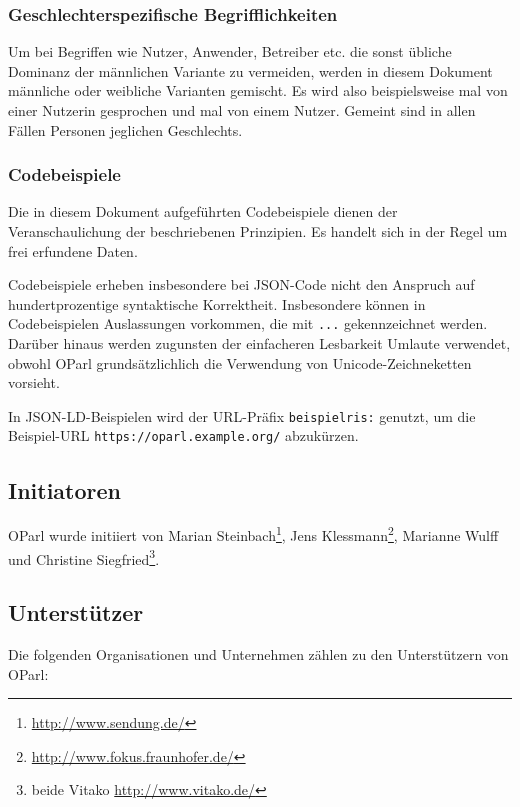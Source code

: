 \documentclass[,a4paper]{article}
\begin{document}
\subsubsection{Geschlechterspezifische
Begrifflichkeiten}\label{geschlechterspezifische-begrifflichkeiten}

Um bei Begriffen wie Nutzer, Anwender, Betreiber etc. die sonst übliche
Dominanz der männlichen Variante zu vermeiden, werden in diesem Dokument
männliche oder weibliche Varianten gemischt. Es wird also beispielsweise
mal von einer Nutzerin gesprochen und mal von einem Nutzer. Gemeint sind
in allen Fällen Personen jeglichen Geschlechts.

\subsubsection{Codebeispiele}\label{codebeispiele}

Die in diesem Dokument aufgeführten Codebeispiele dienen der
Veranschaulichung der beschriebenen Prinzipien. Es handelt sich in der
Regel um frei erfundene Daten.

Codebeispiele erheben insbesondere bei JSON-Code nicht den Anspruch auf
hundertprozentige syntaktische Korrektheit. Insbesondere können in
Codebeispielen Auslassungen vorkommen, die mit \texttt{...}
gekennzeichnet werden. Darüber hinaus werden zugunsten der einfacheren
Lesbarkeit Umlaute verwendet, obwohl OParl grundsätzlichlich die
Verwendung von Unicode-Zeichneketten vorsieht.

In JSON-LD-Beispielen wird der URL-Präfix \texttt{beispielris:} genutzt,
um die Beispiel-URL \texttt{https://oparl.example.org/} abzukürzen.

\subsection{Initiatoren}\label{initiatoren}

OParl wurde initiiert von Marian Steinbach\footnote{\url{http://www.sendung.de/}},
Jens Klessmann\footnote{\url{http://www.fokus.fraunhofer.de/}}, Marianne
Wulff und Christine Siegfried\footnote{beide Vitako
  \url{http://www.vitako.de/}}.

\subsection{Unterstützer}\label{unterstuxfctzer}

Die folgenden Organisationen und Unternehmen zählen zu den Unterstützern
von OParl:
\end{document}
